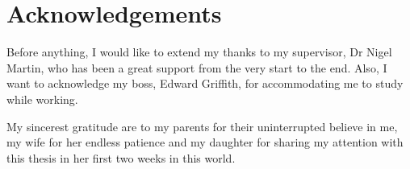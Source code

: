 \chapter*{Acknowledgements}

Before anything, I would like to extend my thanks to my supervisor, Dr Nigel Martin, who has been a great support from the very start to the end. Also, I want to acknowledge my boss, Edward Griffith, for accommodating me to study while working.

My sincerest gratitude are to my parents for their uninterrupted believe in me, my wife for her endless patience and my daughter for sharing my attention with this thesis in her first two weeks in this world.